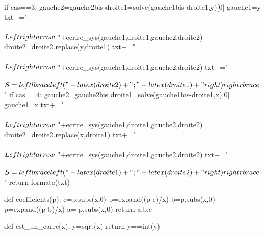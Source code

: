 \begin{pycode}
{        if cas==3:
            gauche2=gauche2bis
            droite1=solve(gauche1bis-droite1,y)[0]
            gauche1=y
            txt+="\\\\ $ \\Leftrightarrow $ "+ecrire_sys(gauche1,droite1,gauche2,droite2)
            droite2=droite2.replace(y,droite1)
            txt+="\\\\ $ \\Leftrightarrow $ "+ecrire_sys(gauche1,droite1,gauche2,droite2)
            txt+="\\\\ $S=\\left\\lbrace\\left ("+latex(droite2)+" ; "+latex(droite1)+" \\right) \\right\\rbrace$"
        if cas==4:
            gauche2=gauche2bis
            droite1=solve(gauche1bis-droite1,x)[0]
            gauche1=x
            txt+="\\\\ $ \\Leftrightarrow $ "+ecrire_sys(gauche1,droite1,gauche2,droite2)
            droite2=droite2.replace(x,droite1)
            txt+="\\\\ $ \\Leftrightarrow $ "+ecrire_sys(gauche1,droite1,gauche2,droite2)
            txt+="\\\\ $S=\\left\\lbrace \\left("+latex(droite1)+" ; "+latex(droite2)+" \\right) \\right\\rbrace$"
    return formate(txt)        
                

def coefficients(p):
    c=p.subs(x,0)
    p=expand((p-c)/x)
    b=p.subs(x,0)
    p=expand((p-b)/x)
    a= p.subs(x,0)
    return a,b,c

def est_un_carre(x):
    y=sqrt(x)
    return y==int(y)

}
\end{pycode}
